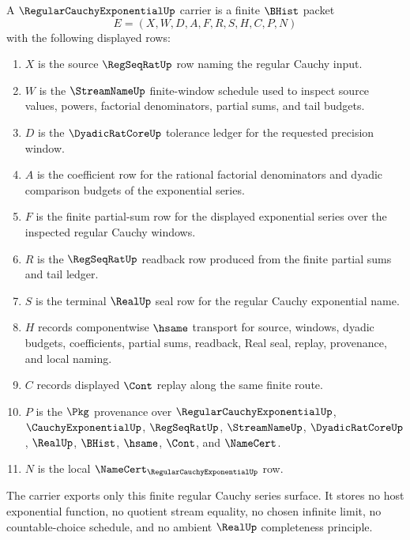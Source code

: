 \begin{definition}
\label{def:regular-cauchy-exponential-carrier}
A $\RegularCauchyExponentialUp$ carrier is a finite $\BHist$ packet
$$
E=(X,W,D,A,F,R,S,H,C,P,N)
$$
with the following displayed rows:
\begin{enumerate}
\item $X$ is the source $\RegSeqRatUp$ row naming the regular Cauchy input.
\item $W$ is the $\StreamNameUp$ finite-window schedule used to inspect source values, powers, factorial denominators, partial sums, and tail budgets.
\item $D$ is the $\DyadicRatCoreUp$ tolerance ledger for the requested precision window.
\item $A$ is the coefficient row for the rational factorial denominators and dyadic comparison budgets of the exponential series.
\item $F$ is the finite partial-sum row for the displayed exponential series over the inspected regular Cauchy windows.
\item $R$ is the $\RegSeqRatUp$ readback row produced from the finite partial sums and tail ledger.
\item $S$ is the terminal $\RealUp$ seal row for the regular Cauchy exponential name.
\item $H$ records componentwise $\hsame$ transport for source, windows, dyadic budgets, coefficients, partial sums, readback, Real seal, replay, provenance, and local naming.
\item $C$ records displayed $\Cont$ replay along the same finite route.
\item $P$ is the $\Pkg$ provenance over $\RegularCauchyExponentialUp$, $\CauchyExponentialUp$, $\RegSeqRatUp$, $\StreamNameUp$, $\DyadicRatCoreUp$, $\RealUp$, $\BHist$, $\hsame$, $\Cont$, and $\NameCert$.
\item $N$ is the local $\NameCert_{\RegularCauchyExponentialUp}$ row.
\end{enumerate}
The carrier exports only this finite regular Cauchy series surface. It stores no host exponential function, no quotient stream equality, no chosen infinite limit, no countable-choice schedule, and no ambient $\RealUp$ completeness principle.
\end{definition}

